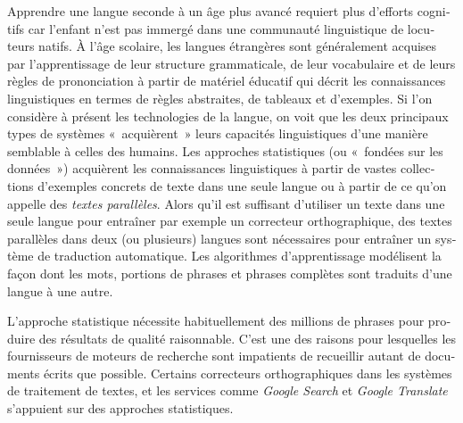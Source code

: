 \begin{french}
\begin{multicols}{2}
Apprendre une langue seconde à un âge plus avancé requiert plus
d'efforts cognitifs car l'enfant n'est pas
immergé dans une communauté linguistique de locuteurs natifs. À
l'âge scolaire, les langues étrangères sont généralement
acquises par l'apprentissage de leur structure grammaticale,
de leur vocabulaire et de leurs règles de prononciation à partir de
matériel éducatif qui décrit les connaissances linguistiques en termes
de règles abstraites, de tableaux et d'exemples.
Si l'on considère à présent les technologies de la langue, on
voit que les deux principaux types de systèmes «~acquièrent~» leurs
capacités linguistiques d'une manière semblable à celles des
humains. Les approches statistiques (ou «~fondées sur les données~»)
acquièrent les connaissances linguistiques à partir de vastes
collections d'exemples concrets de texte dans une seule langue
ou à partir de ce qu'on appelle des {\em textes
  parallèles}. Alors qu'il est suffisant d'utiliser un
texte dans une seule langue pour entraîner par exemple un correcteur
orthographique, des textes parallèles dans deux (ou plusieurs) langues
sont nécessaires pour entraîner un système de traduction
automatique. Les algorithmes d'apprentissage modélisent la
façon dont les mots, portions de phrases et phrases complètes sont
traduits d'une langue à une autre.

L'approche statistique nécessite habituellement des millions
de phrases pour produire des résultats de qualité raisonnable. C'est une des raisons pour lesquelles les fournisseurs de moteurs de
recherche sont impatients de recueillir autant de documents écrits que
possible. Certains correcteurs orthographiques dans les systèmes de
traitement de textes, et les services comme {\em Google Search} et
{\em Google Translate} s'appuient sur des approches
statistiques.


\end{multicols}
\end{french}
